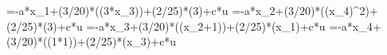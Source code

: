 =-a*x_1+(3/20)*\sin((3*x_3))+(2/25)*\cos(3)+c*u
=-a*x_2+(3/20)*\sin((x_4)^2)+(2/25)*\cos(3)+c*u
=-a*x_3+(3/20)*\sin((x_2+1))+(2/25)*\cos(x_1)+c*u
=-a*x_4+(3/20)*\sin((1*1))+(2/25)*\cos(x_3)+c*u
